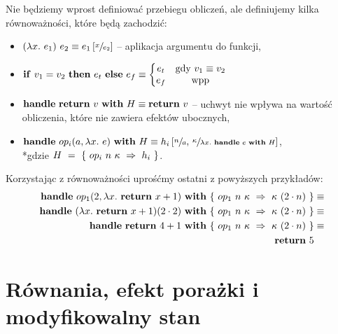 Nie będziemy wprost definiować przebiegu obliczeń, ale definiujemy kilka równoważności, które będą zachodzić:
\begin{itemize}
\item \((\lambda x.\ e_1)\ e_2 \equiv e_1 \left[\sfrac{x}{e_2}\right]\) -- aplikacja argumentu do funkcji,
\item
  \(\begin{aligned}[t]
    \mathbf{if}\ v_1 = v_2\ \mathbf{then}\ e_t\ \mathbf{else}\ e_f \equiv \left\{\begin{matrix}
    e_t & \text{gdy }v_1 \equiv v_2 \\
    e_f & \text{wpp}
    \end{matrix}\right.
  \end{aligned}\)
\item \(\mathbf{handle}\ \mathbf{return}\ v\ \mathbf{with}\ H \equiv \mathbf{return}\ v\) -- uchwyt nie wpływa na wartość obliczenia, które nie zawiera efektów ubocznych,
\item \(\mathbf{handle}\ op_{i}(a, \lambda x.\ e)\ \mathbf{with}\ H \equiv h_i \left[\sfrac{n}{a},\, \sfrac{\kappa}{\lambda x.\ \mathbf{handle}\ e\ \mathbf{with}\ H}\right] \), \\*gdzie \(H~=~\{\ op_i\ n\ \kappa\ \Rightarrow\ h_i \ \}\).
  
\end{itemize}

Korzystając z równoważności uprośćmy ostatni z powyższych przykładów:
\begin{equation}\begin{split}
  \handle{\opi{1}{2}{\fun{x}{\return{x + 1}}}}{\{\ \hcase{op_1}{n\ \kappa}{\kappa\ (2 \cdot n)} \ \}} &\equiv \\
  \handle{(\fun{x}{\return{x+1}}) (2 \cdot 2)}{\{\ \hcase{op_1}{n\ \kappa}{\kappa\ (2 \cdot n)} \ \}} &\equiv \\
  \handle{\return{4+1}}{\{\ \hcase{op_1}{n\ \kappa}{\kappa\ (2 \cdot n)} \ \}} &\equiv \\
  \return{5} %
\end{split}\end{equation}


\section{Równania, efekt porażki i modyfikowalny stan}

